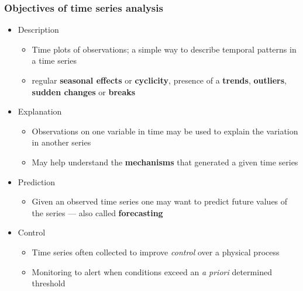 \documentclass{beamer}
\begin{document}
\begin{frame}
\frametitle{Objectives of time series analysis}
\begin{itemize}
    \item Description
    \begin{itemize}
        \item Time plots of observations; a simple way to describe temporal patterns in a time series
        \item regular \textbf{seasonal effects} or \textbf{cyclicity}, presence of a \textbf{trends}, \textbf{outliers}, \textbf{sudden changes} or \textbf{breaks}
    \end{itemize}
    \item Explanation
    \begin{itemize}
        \item Observations on one variable in time may be used to explain the variation in another series
        \item May help understand the \textbf{mechanisms} that generated a given time series
    \end{itemize}
    \item Prediction
    \begin{itemize}
        \item Given an observed time series one may want to predict future values of the series --- also called \textbf{forecasting}
    \end{itemize}
    \item Control
    \begin{itemize}
        \item Time series often collected to improve \textit{control} over a physical process
        \item Monitoring to alert when conditions exceed an \textit{a priori} determined threshold
    \end{itemize}
\end{itemize}
\end{frame}
\end{document}
